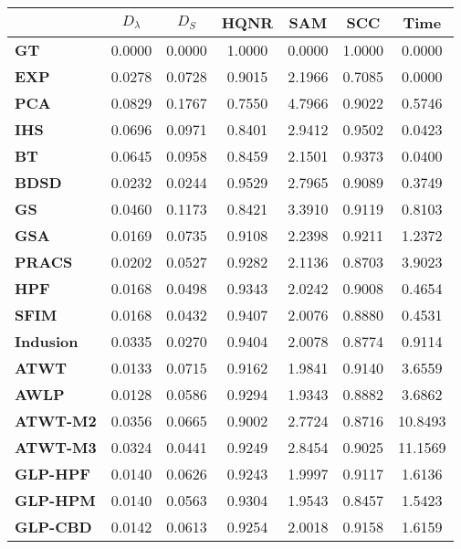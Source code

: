 \begin{tabular}{|l|c|c|c|c|c|c|}
\hline
&\textbf{$D_{\lambda}$}&\textbf{$D_{S}$}&\textbf{HQNR}&\textbf{SAM}&\textbf{SCC}&\textbf{Time}\\\hline
\textbf{GT}&0.0000&0.0000&1.0000&0.0000&1.0000&0.0000\\\hline
\textbf{EXP}&0.0278&0.0728&0.9015&2.1966&0.7085&0.0000\\\hline
\textbf{PCA}&0.0829&0.1767&0.7550&4.7966&0.9022&0.5746\\\hline
\textbf{IHS}&0.0696&0.0971&0.8401&2.9412&0.9502&0.0423\\\hline
\textbf{BT}&0.0645&0.0958&0.8459&2.1501&0.9373&0.0400\\\hline
\textbf{BDSD}&0.0232&0.0244&0.9529&2.7965&0.9089&0.3749\\\hline
\textbf{GS}&0.0460&0.1173&0.8421&3.3910&0.9119&0.8103\\\hline
\textbf{GSA}&0.0169&0.0735&0.9108&2.2398&0.9211&1.2372\\\hline
\textbf{PRACS}&0.0202&0.0527&0.9282&2.1136&0.8703&3.9023\\\hline
\textbf{HPF}&0.0168&0.0498&0.9343&2.0242&0.9008&0.4654\\\hline
\textbf{SFIM}&0.0168&0.0432&0.9407&2.0076&0.8880&0.4531\\\hline
\textbf{Indusion}&0.0335&0.0270&0.9404&2.0078&0.8774&0.9114\\\hline
\textbf{ATWT}&0.0133&0.0715&0.9162&1.9841&0.9140&3.6559\\\hline
\textbf{AWLP}&0.0128&0.0586&0.9294&1.9343&0.8882&3.6862\\\hline
\textbf{ATWT-M2}&0.0356&0.0665&0.9002&2.7724&0.8716&10.8493\\\hline
\textbf{ATWT-M3}&0.0324&0.0441&0.9249&2.8454&0.9025&11.1569\\\hline
\textbf{GLP-HPF}&0.0140&0.0626&0.9243&1.9997&0.9117&1.6136\\\hline
\textbf{GLP-HPM}&0.0140&0.0563&0.9304&1.9543&0.8457&1.5423\\\hline
\textbf{GLP-CBD}&0.0142&0.0613&0.9254&2.0018&0.9158&1.6159\\\hline
\end{tabular}
